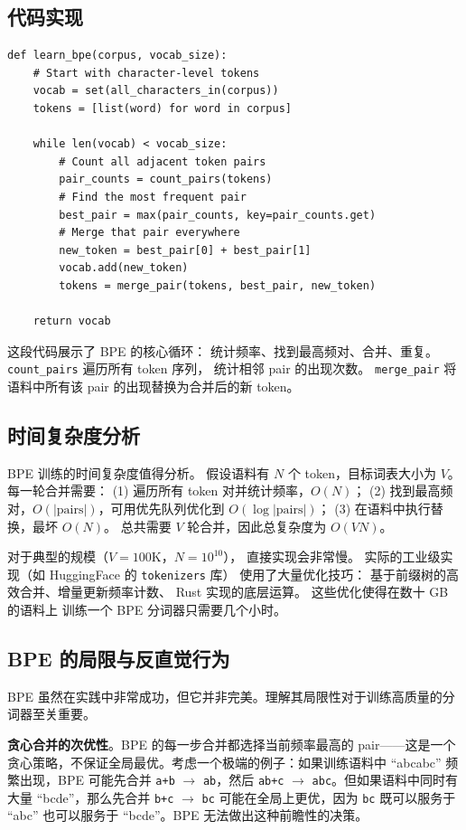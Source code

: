 \subsection{代码实现}

\begin{lstlisting}[caption={BPE core algorithm (simplified)}]
def learn_bpe(corpus, vocab_size):
    # Start with character-level tokens
    vocab = set(all_characters_in(corpus))
    tokens = [list(word) for word in corpus]

    while len(vocab) < vocab_size:
        # Count all adjacent token pairs
        pair_counts = count_pairs(tokens)
        # Find the most frequent pair
        best_pair = max(pair_counts, key=pair_counts.get)
        # Merge that pair everywhere
        new_token = best_pair[0] + best_pair[1]
        vocab.add(new_token)
        tokens = merge_pair(tokens, best_pair, new_token)

    return vocab
\end{lstlisting}

这段代码展示了 BPE 的核心循环：
统计频率、找到最高频对、合并、重复。
\texttt{count\_pairs} 遍历所有 token 序列，
统计相邻 pair 的出现次数。
\texttt{merge\_pair} 将语料中所有该 pair 的出现替换为合并后的新 token。

\subsection{时间复杂度分析}

BPE 训练的时间复杂度值得分析。
假设语料有 $N$ 个 token，目标词表大小为 $V$。
每一轮合并需要：
(1) 遍历所有 token 对并统计频率，$O(N)$；
(2) 找到最高频对，$O(|\text{pairs}|)$，可用优先队列优化到 $O(\log|\text{pairs}|)$；
(3) 在语料中执行替换，最坏 $O(N)$。
总共需要 $V$ 轮合并，因此总复杂度为 $O(VN)$。

对于典型的规模（$V = 100\text{K}$，$N = 10^{10}$），
直接实现会非常慢。
实际的工业级实现（如 HuggingFace 的 \texttt{tokenizers} 库）
使用了大量优化技巧：
基于前缀树的高效合并、增量更新频率计数、
Rust 实现的底层运算。
这些优化使得在数十 GB 的语料上
训练一个 BPE 分词器只需要几个小时。

\subsection{BPE 的局限与反直觉行为}

BPE 虽然在实践中非常成功，但它并非完美。理解其局限性对于训练高质量的分词器至关重要。

\textbf{贪心合并的次优性}。BPE 的每一步合并都选择当前频率最高的 pair——这是一个贪心策略，不保证全局最优。考虑一个极端的例子：如果训练语料中 “abcabc” 频繁出现，BPE 可能先合并 \texttt{a+b} $\to$ \texttt{ab}，然后 \texttt{ab+c} $\to$ \texttt{abc}。但如果语料中同时有大量 “bcde”，那么先合并 \texttt{b+c} $\to$ \texttt{bc} 可能在全局上更优，因为 \texttt{bc} 既可以服务于 “abc” 也可以服务于 “bcde”。BPE 无法做出这种前瞻性的决策。

